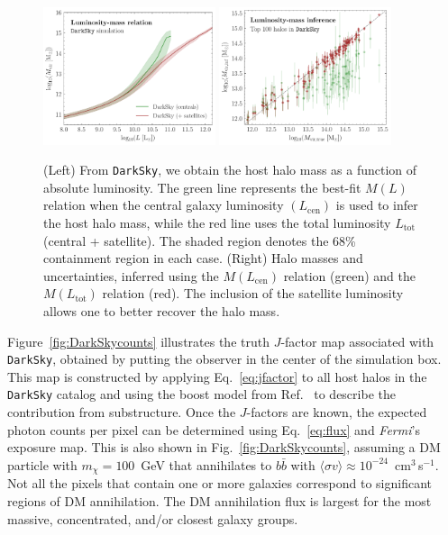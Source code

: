 \begin{figure}
   \centering
   \includegraphics[width=0.45\textwidth]{ch-darksky/plots//LofM.pdf}
   \includegraphics[width=0.45\textwidth]{ch-darksky/plots//LofMinf.pdf}
   \caption{(Left) From \texttt{DarkSky}, we obtain the host halo mass as a function of absolute luminosity.  The green line represents the best-fit $M(L)$ relation when the central galaxy luminosity $(L_\mathrm{cen})$ is used to infer the host halo mass, while the red line uses the total luminosity $L_\mathrm{tot}$ (central + satellite).  The shaded region denotes the 68\% containment region in each case. (Right) Halo masses and uncertainties, inferred using the $M(L_\mathrm{cen})$ relation (green) and the $M(L_\mathrm{tot})$ relation (red).  The inclusion of the satellite luminosity allows one to better recover the halo mass.}
   \label{fig:ltom}
\end{figure}  


Figure~\ref{fig:DarkSkycounts} illustrates the truth $J$-factor map associated with \texttt{DarkSky}, obtained by putting the observer in the center of the simulation box.  This map is constructed by applying Eq.~\ref{eq:jfactor} to all host halos in the \texttt{DarkSky} catalog and using the boost model from Ref.~\cite{Bartels:2015uba} to describe the contribution from substructure.  Once the $J$-factors are known, the expected photon counts per pixel can be determined using Eq.~\ref{eq:flux} and \emph{Fermi}'s exposure map.  This is also shown in Fig.~\ref{fig:DarkSkycounts}, assuming a DM particle with $m_\chi = 100$~GeV that annihilates to $b \bar{b}$ with $\langle \sigma v \rangle \approx 10^{-24}$~cm$^3\,$s$^{-1}$.  Not all the pixels that contain one or more galaxies correspond to significant regions of DM annihilation.  The DM annihilation flux is largest for the most massive, concentrated, and/or closest galaxy groups.  


